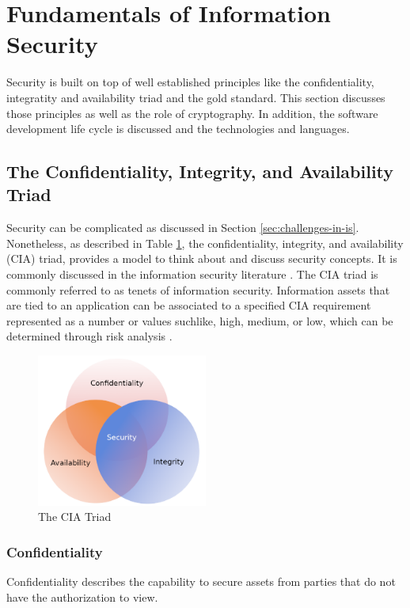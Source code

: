 \section{Fundamentals of Information Security}
Security is built on top of well established principles like the confidentiality, integratity and availability triad and the gold standard. This section discusses those principles as well as the role of cryptography. In addition, the software development life cycle is discussed and the technologies and languages.

\subsection{The Confidentiality, Integrity, and Availability Triad}
Security can be complicated as discussed in Section \ref{sec:challenges-in-is}. Nonetheless, as described in Table \ref{fig:cia}, the confidentiality, integrity, and availability (CIA) triad, provides a model to think about and discuss security concepts. It is commonly discussed in the information security literature \cite{andress2014the} \cite{srinivasan2016cissp} \cite{death2017information}. The CIA triad is commonly referred to as tenets of information security. Information assets that are tied to an application can be associated to a specified CIA requirement represented as a number or values suchlike, high, medium, or low, which can be determined through risk analysis \cite{srinivasan2016cissp}. 

\begin{figure}[!h]
    \centering
    \includegraphics[width=0.5\textwidth]{../../img/chapter_2/cia-triad.png}
    \caption{The CIA Triad}\label{fig:cia}
\end{figure}

\subsubsection{Confidentiality}
Confidentiality describes the capability to secure assets from parties that do not have the authorization to view. 
